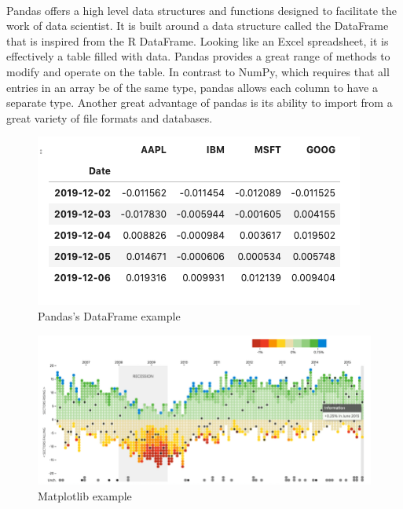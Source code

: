 \documentclass{tufte-handout}
\begin{document}
\\ Pandas offers a high level data structures and functions designed to facilitate the work of data scientist. It is built around a data structure called the DataFrame that is inspired from the R DataFrame.  Looking like an Excel spreadsheet, it is effectively a table filled with data. Pandas provides a great range of methods to modify and operate on the table. In contrast to NumPy, which requires that all entries in an array be of the same type, pandas allows each column to have a separate type. Another great advantage of pandas is its ability to import from a great variety of file formats and databases.
\begin{figure}[h]%
  \includegraphics[width=\linewidth]{pandas.png}
  \caption{Pandas's DataFrame example}
  \label{fig:packages}
\end{figure}
\begin{figure}[h]%
  \includegraphics[width=\linewidth]{matplotlib.png}
  \caption{Matplotlib example}
  \label{fig:packages}
\end{figure}
\end{document}
